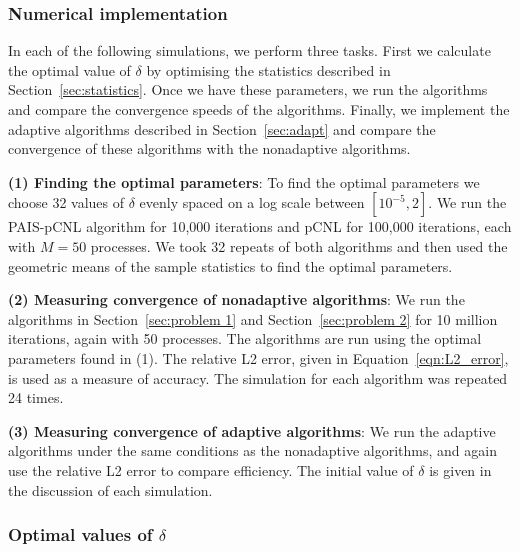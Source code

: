 \documentclass[final]{siamltex}
\begin{document}
\subsubsection{Numerical implementation}\label{sec:Implementation P1}

In each of the following simulations, we perform three tasks. First we calculate the optimal value of $\delta$ by optimising the statistics described in Section~\ref{sec:statistics}. Once we have these parameters, we run the algorithms and compare the convergence speeds of the algorithms. Finally, we implement the adaptive algorithms described in Section~\ref{sec:adapt} and compare the convergence of these algorithms with the nonadaptive algorithms.

{\bf (1) Finding the optimal parameters}: To find the optimal
parameters we choose 32 values of $\delta$ evenly spaced on a log scale
between $[10^{-5}, 2]$. We run the PAIS-pCNL algorithm for 10,000 iterations and pCNL for 100,000 iterations, each with $M=50$ processes. We took 32 repeats of both algorithms and then used the geometric means of the sample statistics to find the optimal parameters.

{\bf (2) Measuring convergence of nonadaptive algorithms}: We run the algorithms in Section~\ref{sec:problem 1} and Section~\ref{sec:problem 2} for 10 million iterations, again with 50 processes. The algorithms are run using the optimal parameters found in (1). The relative L2 error, given in Equation~\ref{eqn:L2_error}, is used as a measure of accuracy. The simulation for each algorithm was repeated 24 times.

{\bf (3) Measuring convergence of adaptive algorithms}: We run the
adaptive algorithms under the same conditions as the nonadaptive
algorithms, and again use the relative L2 error to compare
efficiency. The initial value of $\delta$ is given in the discussion
of each simulation.


\subsubsection{Optimal values of $\delta$}\label{sec:Optimal values P1}
\end{document}
